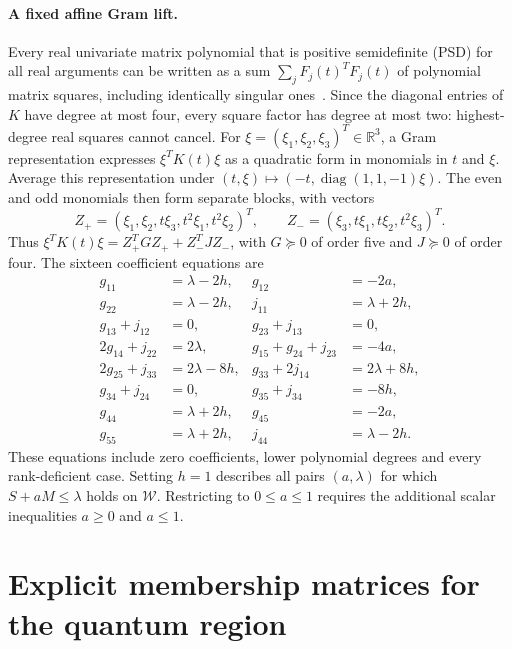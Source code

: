 \documentclass[11pt]{article}
\theoremstyle{remark}\newtheorem{remark}[theorem]{Remark}
\newcommand{\W}{\mathcal W}\newcommand{\sxdeg}{\operatorname{sxdeg}}
\begin{document}
\paragraph{A fixed affine Gram lift.}
Every real univariate matrix polynomial that is positive semidefinite (PSD)
for all real arguments can be written as a sum $\sum_j F_j(t)^TF_j(t)$
of polynomial matrix squares, including identically singular ones~\cite{hs}.
Since the diagonal entries of \(K\) have degree at most four, every square factor
has degree at most two: highest-degree real squares cannot cancel.
For $\xi=(\xi_1,\xi_2,\xi_3)^T\in\mathbb R^3$, a Gram representation
expresses $\xi^TK(t)\xi$ as a quadratic form in monomials in $t$ and $\xi$.
Average this representation under
$(t,\xi)\mapsto(-t,\operatorname{diag}(1,1,-1)\xi)$.
The even and odd monomials then form separate blocks, with vectors
\[
 Z_+=(\xi_1,\xi_2,t\xi_3,t^2\xi_1,t^2\xi_2)^T,\qquad
 Z_-=(\xi_3,t\xi_1,t\xi_2,t^2\xi_3)^T.
\]
Thus \(\xi^TK(t)\xi=Z_+^TGZ_++Z_-^TJZ_-\), with
\(G\succeq0\) of order five and \(J\succeq0\) of order four.
The sixteen coefficient equations are
\begin{equation}
\begin{aligned}
 g_{11}&=\lambda-2h,&g_{12}&=-2a,\\
 g_{22}&=\lambda-2h,&j_{11}&=\lambda+2h,\\
 g_{13}+j_{12}&=0,&g_{23}+j_{13}&=0,\\
 2g_{14}+j_{22}&=2\lambda,&g_{15}+g_{24}+j_{23}&=-4a,\\
 2g_{25}+j_{33}&=2\lambda-8h,&g_{33}+2j_{14}&=2\lambda+8h,\\
 g_{34}+j_{24}&=0,&g_{35}+j_{34}&=-8h,\\
 g_{44}&=\lambda+2h,&g_{45}&=-2a,\\
 g_{55}&=\lambda+2h,&j_{44}&=\lambda-2h .
\end{aligned}
\label{eq:rows}
\end{equation}
These equations include zero coefficients, lower polynomial degrees and every
rank-deficient case. Setting \(h=1\) describes all pairs $(a,\lambda)$ for
which $S+aM\le\lambda$ holds on $\W$. Restricting to \(0\le a\le1\)
requires the additional scalar inequalities $a\ge0$ and $a\le1$.

\section{Explicit membership matrices for the quantum region}
\end{document}
